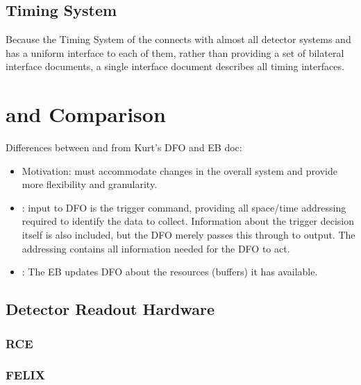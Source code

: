 \subsection{Timing System}
Because the Timing System of the   connects with
almost all detector systems and has a uniform interface to each of
them, rather than providing a set of 
bilateral interface documents, a single interface document
 describes all timing interfaces. 

\section{ and  Comparison}
\label{sec:fd-daq:protodune}

Differences between  and  from Kurt's DFO and EB doc:
\begin{itemize}
\item Motivation: must accommodate changes in the overall system and provide more flexibility and granularity.
\item {}: input to DFO is the trigger command, providing all space/time addressing required to identify the data to collect.  Information about the trigger decision itself is also included, but the DFO merely passes this through to output.  The addressing contains all information needed for the DFO to act.
\item {}: The EB updates DFO about the resources (buffers) it has available.
\end{itemize}

\subsection{Detector Readout Hardware}


\subsubsection{RCE}

\subsubsection{FELIX}

